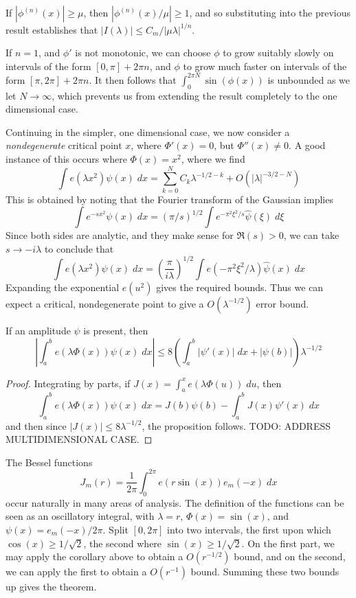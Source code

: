 \begin{remark}
    If $|\phi^{(n)}(x)| \geq \mu$, then $|\phi^{(n)}(x)/\mu| \geq 1$, and so substituting into the previous result establishes that $|I(\lambda)| \leq C_m / |\mu \lambda|^{1/n}$.
\end{remark}

\begin{remark}
    If $n = 1$, and $\phi'$ is not monotonic, we can choose $\phi$ to grow suitably slowly on intervals of the form $[0,\pi] + 2 \pi n$, and $\phi$ to grow much faster on intervals of the form $[\pi, 2\pi] + 2 \pi n$. It then follows that $\int_0^{2 \pi N} \sin(\phi(x))$ is unbounded as we let $N \to \infty$, which prevents us from extending the result completely to the one dimensional case.
\end{remark}

Continuing in the simpler, one dimensional case, we now consider a {\it nondegenerate} critical point $x$, where $\Phi'(x) = 0$, but $\Phi''(x) \neq 0$. A good instance of this occurs where $\Phi(x) = x^2$, where we find
%
\[ \int e(\lambda x^2) \psi(x)\; dx = \sum_{k = 0}^N C_k \lambda^{-1/2-k} + O(|\lambda|^{-3/2-N}) \]
%
This is obtained by noting that the Fourier transform of the Gaussian implies
%
\[ \int e^{- sx^2} \psi(x)\; dx = (\pi/s)^{1/2} \int e^{- \pi^2 \xi^2/ s} \widehat{\psi}(\xi)\; d\xi \]
%
Since both sides are analytic, and they make sense for $\Re(s) > 0$, we can take $s \to -i\lambda$ to conclude that
%
\[ \int e(\lambda x^2) \psi(x)\; dx = \left( \frac{\pi}{i \lambda} \right)^{1/2} \int e(-\pi^2 \xi^2/\lambda) \widehat{\psi}(x)\; dx \]
%
Expanding the exponential $e(u^2)$ gives the required bounds. Thus we can expect a critical, nondegenerate point to give a $O(\lambda^{-1/2})$ error bound.

\begin{corollary}
    If an amplitude $\psi$ is present, then
    \[ \left| \int_a^b e(\lambda \Phi(x)) \psi(x)\; dx \right| \leq 8 \left( \int_a^b |\psi'(x)|\; dx + |\psi(b)| \right) \lambda^{-1/2} \]
\end{corollary}
\begin{proof}
    Integrating by parts, if $J(x) = \int_a^x e(\lambda \Phi(u))\; du$, then
    \[ \int_a^b e(\lambda \Phi(x)) \psi(x)\; dx = J(b)\psi(b) - \int_a^b J(x) \psi'(x)\; dx \]
    and then since $|J(x)| \leq 8\lambda^{-1/2}$, the proposition follows. TODO: ADDRESS MULTIDIMENSIONAL CASE.
\end{proof}

\begin{example}
    The Bessel functions
    \[ J_m(r) = \frac{1}{2\pi} \int_0^{2\pi} e(r \sin(x)) e_m(-x)\; dx \]
    occur naturally in many areas of analysis. The definition of the functions can be seen as an oscillatory integral, with $\lambda = r$, $\Phi(x) = \sin(x)$, and $\psi(x) = e_m(-x)/2\pi$. Split $[0,2\pi]$ into two intervals, the first upon which $\cos(x) \geq 1/\sqrt{2}$, the second where $\sin(x) \geq 1/\sqrt{2}$. On the first part, we may apply the corollary above to obtain a $O(r^{-1/2})$ bound, and on the second, we can apply the first to obtain a $O(r^{-1})$ bound. Summing these two bounds up gives the theorem.
\end{example}

